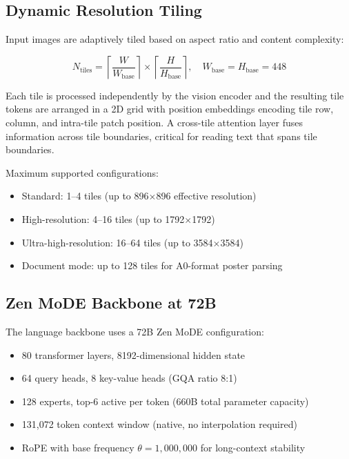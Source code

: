 \documentclass[11pt,a4paper]{article}
\begin{document}
\subsection{Dynamic Resolution Tiling}

Input images are adaptively tiled based on aspect ratio and content complexity:

\begin{equation}
N_{\text{tiles}} = \left\lceil \frac{W}{W_{\text{base}}} \right\rceil \times \left\lceil \frac{H}{H_{\text{base}}} \right\rceil, \quad W_{\text{base}} = H_{\text{base}} = 448
\end{equation}

Each tile is processed independently by the vision encoder and the resulting tile
tokens are arranged in a 2D grid with position embeddings encoding tile row, column,
and intra-tile patch position. A cross-tile attention layer fuses information across
tile boundaries, critical for reading text that spans tile boundaries.

Maximum supported configurations:
\begin{itemize}
\item Standard: 1--4 tiles (up to 896$\times$896 effective resolution)
\item High-resolution: 4--16 tiles (up to 1792$\times$1792)
\item Ultra-high-resolution: 16--64 tiles (up to 3584$\times$3584)
\item Document mode: up to 128 tiles for A0-format poster parsing
\end{itemize}

\subsection{Zen MoDE Backbone at 72B}

The language backbone uses a 72B Zen MoDE configuration:

\begin{itemize}
\item 80 transformer layers, 8192-dimensional hidden state
\item 64 query heads, 8 key-value heads (GQA ratio 8:1)
\item 128 experts, top-6 active per token (660B total parameter capacity)
\item 131,072 token context window (native, no interpolation required)
\item RoPE with base frequency $\theta = 1{,}000{,}000$ for long-context stability
\end{itemize}
\end{document}
